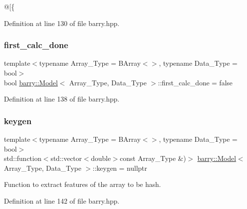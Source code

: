 @\mbox{[}\{ 



Definition at line 130 of file barry.\+hpp.

\mbox{\label{classbarry_1_1_model_a22a07971754864203728cd43b2c026c3}} 
\subsubsection{\texorpdfstring{first\+\_\+calc\+\_\+done}{first\_calc\_done}}
{\footnotesize\ttfamily template$<$typename Array\+\_\+\+Type  = B\+Array$<$$>$, typename Data\+\_\+\+Type  = bool$>$ \\
bool \hyperlink{classbarry_1_1_model}{barry\+::\+Model}$<$ Array\+\_\+\+Type, Data\+\_\+\+Type $>$\+::first\+\_\+calc\+\_\+done = false}



Definition at line 138 of file barry.\+hpp.

\mbox{\label{classbarry_1_1_model_af0375943f9e6f9df15b305ed2bfd17a7}} 
\subsubsection{\texorpdfstring{keygen}{keygen}}
{\footnotesize\ttfamily template$<$typename Array\+\_\+\+Type  = B\+Array$<$$>$, typename Data\+\_\+\+Type  = bool$>$ \\
std\+::function$<$std\+::vector$<$double$>$const Array\+\_\+\+Type \&)$>$ \hyperlink{classbarry_1_1_model}{barry\+::\+Model}$<$ Array\+\_\+\+Type, Data\+\_\+\+Type $>$\+::keygen = nullptr}



Function to extract features of the array to be hash. 



Definition at line 142 of file barry.\+hpp.

\mbox{\label{classbarry_1_1_model_af6c9a2fbf53e9e12237fc200f3d8ffc2}} 
